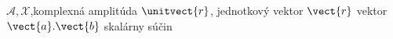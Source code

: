 $\mathcal{A},\mathcal{X}$,komplexná amplitúda
$\unitvect{r}$, jednotkový vektor
$\vect{r}$ vektor
$\vect{a}.\vect{b}$ skalárny súčin
